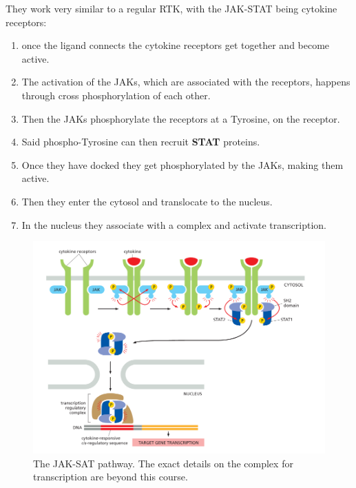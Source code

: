 \documentclass[../main.tex]{subfiles}
\begin{document}
They work very similar to a regular RTK, with the JAK-STAT being cytokine receptors:
\begin{enumerate}
	\item once the ligand connects the cytokine receptors get together and become active.
	\item The activation of the JAKs, which are associated with the receptors, happens through cross phosphorylation of each other.
	\item Then the JAKs phosphorylate the receptors at a Tyrosine, on the receptor.
	\item Said phospho-Tyrosine can then recruit \textbf{\gls{STAT}} proteins.
	\item Once they have docked they get phosphorylated by the JAKs, making them active.
	\item Then they enter the cytosol and translocate to the nucleus.
	\item In the nucleus they associate with a complex and activate transcription.
\end{enumerate}

\begin{figure}[H]
	\centering
	\includegraphics[width=0.7\linewidth]{Jak_mech}
	\caption{The JAK-SAT pathway. The exact details on the complex for transcription are beyond this course.}
\end{figure}
\end{document}
